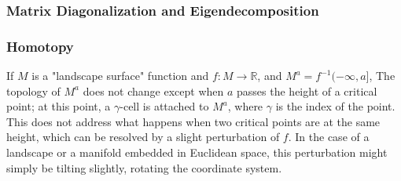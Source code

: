 \subsubsection{Matrix Diagonalization and Eigendecomposition}



\subsubsection{Homotopy}

If $M$ is a "landscape surface" function and $f : M \rightarrow \mathbb{R}$,
and $M^a = f^{-1} (-\infty, a]$,
The topology of $M^{a}$ does not change except when $a$ passes the height of a critical point;
at this point, a $\gamma$-cell is attached to $M^{a}$, where $\gamma$ is the index of the point.
This does not address what happens when two critical points are at the same height,
which can be resolved by a slight perturbation of $f$.
In the case of a landscape or a manifold embedded in Euclidean space, this perturbation might simply be tilting slightly, rotating the coordinate system. 